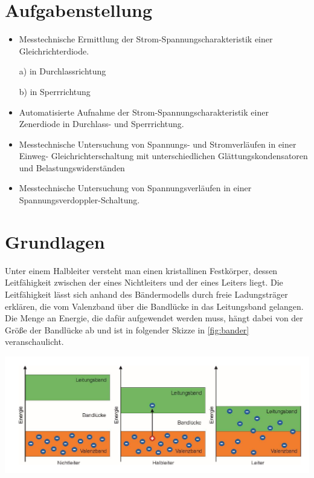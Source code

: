 \documentclass[11pt,ngerman]{scrartcl}
\begin{document}

\tableofcontents
\newpage

\section{Aufgabenstellung\label{Auf0}}

\begin{itemize}
	\item Messtechnische Ermittlung der Strom-Spannungscharakteristik einer Gleichrichterdiode.

	      \subitem a) in Durchlassrichtung

	      \subitem b) in Sperrrichtung

	\item Automatisierte Aufnahme der Strom-Spannungscharakteristik einer Zenerdiode in Durchlass- und Sperrrichtung.

	\item Messtechnische Untersuchung von Spannungs- und Stromverläufen in einer Einweg- Gleichrichterschaltung mit unterschiedlichen Glättungskondensatoren und Belastungswiderständen

	\item Messtechnische Untersuchung von Spannungsverläufen in einer Spannungsverdoppler-Schaltung.
\end{itemize}




\section{Grundlagen}

Unter einem Halbleiter versteht man einen kristallinen Festkörper, dessen Leitfähigkeit zwischen der eines Nichtleiters und der eines Leiters liegt. Die Leitfähigkeit lässt sich anhand des Bändermodells durch freie Ladungsträger erklären, die vom Valenzband über die Bandlücke in das Leitungsband gelangen. Die Menge an Energie, die dafür aufgewendet werden muss, hängt dabei von der Größe der Bandlücke ab und ist in folgender Skizze in \autoref{fig:bander} veranschaulicht.

\begin{center}
	\begin{minipage}[t]{\textwidth}
		\includegraphics[width=\textwidth]{skizze_bander}
		\label{fig:bander}
	\end{minipage}
\end{center}
\end{document}
